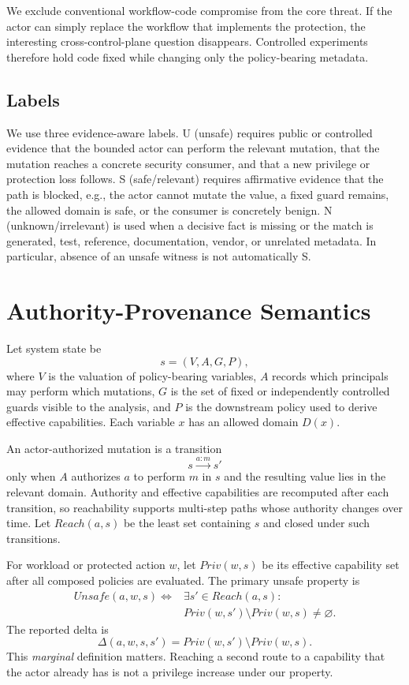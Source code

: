 \documentclass[sigconf,review,anonymous]{acmart}
\newcommand{\U}{\textsf{U}}
\newcommand{\Ssafe}{\textsf{S}}
\newcommand{\N}{\textsf{N}}
\begin{document}
We exclude conventional workflow-code compromise from the core threat.  If the
actor can simply replace the workflow that implements the protection, the
interesting cross-control-plane question disappears.  Controlled experiments
therefore hold code fixed while changing only the policy-bearing metadata.

\subsection{Labels}

We use three evidence-aware labels.  \U{} (unsafe) requires public or controlled
evidence that the bounded actor can perform the relevant mutation, that the
mutation reaches a concrete security consumer, and that a new privilege or
protection loss follows.  \Ssafe{} (safe/relevant) requires affirmative evidence
that the path is blocked, e.g., the actor cannot mutate the value, a fixed guard
remains, the allowed domain is safe, or the consumer is concretely benign.  \N{}
(unknown/irrelevant) is used when a decisive fact is missing or the match is
generated, test, reference, documentation, vendor, or unrelated metadata.  In
particular, absence of an unsafe witness is not automatically \Ssafe{}.

\section{Authority-Provenance Semantics}
\label{sec:model}

Let system state be
\[
  s=(V,A,G,P),
\]
where $V$ is the valuation of policy-bearing variables, $A$ records which
principals may perform which mutations, $G$ is the set of fixed or independently
controlled guards visible to the analysis, and $P$ is the downstream policy used
to derive effective capabilities.  Each variable $x$ has an allowed domain
$D(x)$.

An actor-authorized mutation is a transition
\[
  s \xrightarrow{a:m} s'
\]
only when $A$ authorizes $a$ to perform $m$ in $s$ and the resulting value lies
in the relevant domain.  Authority and effective capabilities are recomputed
after each transition, so reachability supports multi-step paths whose authority
changes over time.  Let $Reach(a,s)$ be the least set containing $s$ and closed
under such transitions.

For workload or protected action $w$, let $Priv(w,s)$ be its effective
capability set after all composed policies are evaluated.  The primary unsafe
property is
\[
\begin{aligned}
 Unsafe(a,w,s) \iff {}& \exists s'\in Reach(a,s):\\
 & Priv(w,s')\setminus Priv(w,s)\neq\varnothing.
\end{aligned}
\]
The reported delta is
\[
 \Delta(a,w,s,s')=Priv(w,s')\setminus Priv(w,s).
\]
This \emph{marginal} definition matters.  Reaching a second route to a capability
that the actor already has is not a privilege increase under our property.
\end{document}
